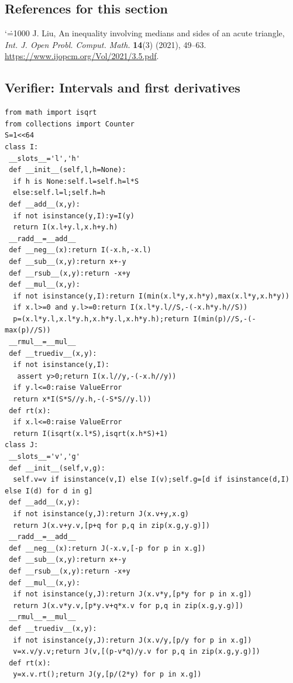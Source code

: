 \documentclass[11pt,a4paper]{article}
\makeatletter
\numberwithin{equation}{section}
\theoremstyle{definition}
\theoremstyle{remark}
\renewenvironment{thebibliography}[1]
 {\subsection*{References for this section}\small
  \list{\@biblabel{\@arabic\c@enumiv}}
       {\settowidth\labelwidth{\@biblabel{#1}}\leftmargin\labelwidth
        \advance\leftmargin\labelsep\@openbib@code
        \usecounter{enumiv}\let\p@enumiv\@empty
        \renewcommand\theenumiv{\@arabic\c@enumiv}}
  \sloppy\clubpenalty4000\widowpenalty4000\sfcode`\.=1000\relax}
 {\def\@noitemerr{\@latex@warning{Empty bibliography}}\endlist}
\makeatother
\begin{document}
\begin{thebibliography}{1}
 J. Liu, An inequality involving medians and sides of an acute triangle, \emph{Int. J. Open Probl. Comput. Math.} \textbf{14}(3) (2021), 49--63.
\url{https://www.ijopcm.org/Vol/2021/3.5.pdf}.
\end{thebibliography}
\subsection*{Verifier: Intervals and first derivatives}
\scriptsize\begin{Verbatim}
from math import isqrt
from collections import Counter
S=1<<64
class I:
 __slots__='l','h'
 def __init__(self,l,h=None):
  if h is None:self.l=self.h=l*S
  else:self.l=l;self.h=h
 def __add__(x,y):
  if not isinstance(y,I):y=I(y)
  return I(x.l+y.l,x.h+y.h)
 __radd__=__add__
 def __neg__(x):return I(-x.h,-x.l)
 def __sub__(x,y):return x+-y
 def __rsub__(x,y):return -x+y
 def __mul__(x,y):
  if not isinstance(y,I):return I(min(x.l*y,x.h*y),max(x.l*y,x.h*y))
  if x.l>=0 and y.l>=0:return I(x.l*y.l//S,-(-x.h*y.h//S))
  p=(x.l*y.l,x.l*y.h,x.h*y.l,x.h*y.h);return I(min(p)//S,-(-max(p)//S))
 __rmul__=__mul__
 def __truediv__(x,y):
  if not isinstance(y,I):
   assert y>0;return I(x.l//y,-(-x.h//y))
  if y.l<=0:raise ValueError
  return x*I(S*S//y.h,-(-S*S//y.l))
 def rt(x):
  if x.l<=0:raise ValueError
  return I(isqrt(x.l*S),isqrt(x.h*S)+1)
class J:
 __slots__='v','g'
 def __init__(self,v,g):
  self.v=v if isinstance(v,I) else I(v);self.g=[d if isinstance(d,I) else I(d) for d in g]
 def __add__(x,y):
  if not isinstance(y,J):return J(x.v+y,x.g)
  return J(x.v+y.v,[p+q for p,q in zip(x.g,y.g)])
 __radd__=__add__
 def __neg__(x):return J(-x.v,[-p for p in x.g])
 def __sub__(x,y):return x+-y
 def __rsub__(x,y):return -x+y
 def __mul__(x,y):
  if not isinstance(y,J):return J(x.v*y,[p*y for p in x.g])
  return J(x.v*y.v,[p*y.v+q*x.v for p,q in zip(x.g,y.g)])
 __rmul__=__mul__
 def __truediv__(x,y):
  if not isinstance(y,J):return J(x.v/y,[p/y for p in x.g])
  v=x.v/y.v;return J(v,[(p-v*q)/y.v for p,q in zip(x.g,y.g)])
 def rt(x):
  y=x.v.rt();return J(y,[p/(2*y) for p in x.g])
\end{Verbatim}
\end{document}
